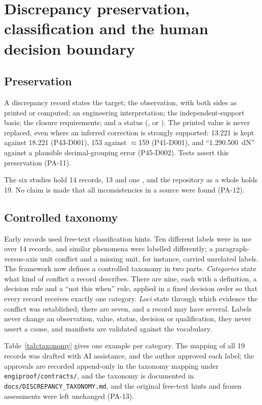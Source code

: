 \section{Discrepancy preservation, classification and the human decision boundary}
\label{sec:discrepancy}

\subsection{Preservation}
A discrepancy record states the target; the observation, with both sides as printed or computed; an engineering interpretation; the independent-support basis; the closure requirements; and a status (,  or ). The printed value is never replaced, even where an inferred correction is strongly supported: 13.221 is kept against 18.221 (P43-D001), 153 against $\approx$159 (P41-D001), and ``1.290.500~dN'' against a plausible decimal-grouping error (P45-D002). Tests assert this preservation (PA-11).

The six studies hold 14 records, 13  and one , and the repository as a whole holds 19. No claim is made that all inconsistencies in a source were found (PA-12).

\subsection{Controlled taxonomy}
Early records used free-text classification hints. Ten different labels were in use over 14 records, and similar phenomena were labelled differently; a paragraph-versus-axis unit conflict and a missing unit, for instance, carried unrelated labels. The framework now defines a controlled taxonomy in two parts. \emph{Categories} state what kind of conflict a record describes. There are nine, each with a definition, a decision rule and a ``not this when'' rule, applied in a fixed decision order so that every record receives exactly one category. \emph{Loci} state through which evidence the conflict was established; there are seven, and a record may have several. Labels never change an observation, value, status, decision or qualification, they never assert a cause, and manifests are validated against the vocabulary.

Table~\ref{tab:taxonomy} gives one example per category. The mapping of all 19 records was drafted with AI assistance, and the author approved each label; the approvals are recorded append-only in the taxonomy mapping under \texttt{engiproof/\allowbreak{}contracts/}, and the taxonomy is documented in \texttt{docs/\allowbreak{}DISCREPANCY\_\allowbreak{}TAXONOMY.md}, and the original free-text hints and frozen assessments were left unchanged (PA-13).

